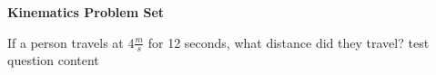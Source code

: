 \documentclass{exam}
\begin{document}
    \vspace*{-25px}
    \begin{center}
        \huge \textbf{Kinematics Problem Set}
    \end{center}
    \vspace*{0.05in}
    \begin{questions}
        \large
        \question If a person travels at $4 \frac{m}{s}$ for 12 seconds, what distance did they travel?
        \question test question content
    \end{questions}
\end{document}
